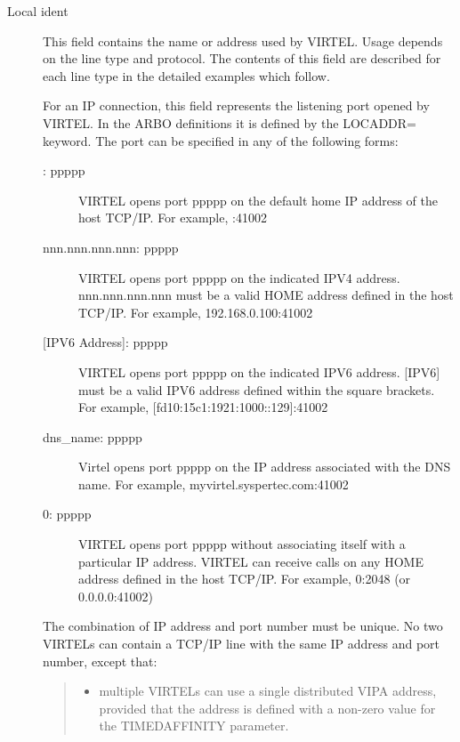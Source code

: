 \documentclass[letterpaper,10pt,english]{sphinxmanual}
\begin{document}
\label{\detokenize{connectivity_guide:bookmark13}}\begin{description}
\item[{Local ident}] \leavevmode
This field contains the name or address used by VIRTEL. Usage depends on the line type and protocol. The contents of this field are described for each line type in the detailed examples which
follow.

For an IP connection, this field represents the listening port opened by VIRTEL. In the ARBO definitions it is defined by the LOCADDR= keyword. The port can be specified in any of the following forms:
\begin{description}
\item[{: ppppp}] \leavevmode
VIRTEL opens port ppppp on the default home IP address of the host
TCP/IP. For example, :41002

\item[{nnn.nnn.nnn.nnn: ppppp}] \leavevmode
VIRTEL opens port ppppp on the indicated IPV4 address. nnn.nnn.nnn.nnn
must be a valid HOME address defined in the host TCP/IP. For
example, 192.168.0.100:41002

\item[{{[}IPV6 Address{]}: ppppp}] \leavevmode
VIRTEL opens port ppppp on the indicated IPV6 address. {[}IPV6{]}
must be a valid IPV6 address defined within the square brackets. For
example, {[}fd10:15c1:1921:1000::129{]}:41002

\item[{dns\_name: ppppp}] \leavevmode
Virtel opens port ppppp on the IP address associated with the DNS name. For example, myvirtel.syspertec.com:41002

\item[{0: ppppp}] \leavevmode
VIRTEL opens port ppppp without associating itself with a particular
IP address. VIRTEL can receive calls on any HOME address defined in
the host TCP/IP. For example, 0:2048 (or 0.0.0.0:41002)

\end{description}

The combination of IP address and port number must be unique. No two VIRTELs can contain a TCP/IP line with the same IP address and port number, except that:
\begin{quote}
\begin{itemize}
\item {} 
multiple VIRTELs can use a single distributed VIPA address, provided that the address is defined with a non-zero value for the TIMEDAFFINITY parameter.


\end{itemize}
\end{quote}
\end{description}
\end{document}

